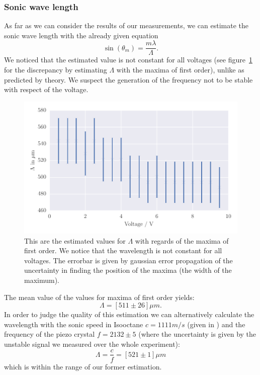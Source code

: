 \subsubsection{Sonic wave length}
As far as we can consider the results of our measurements,
we can estimate the sonic wave length with the already
given equation 
\begin{equation}
\sin(\theta_m) = \frac{m \lambda}{\Lambda}.
\end{equation}
We noticed that the estimated value is not constant for all voltages (see figure~\ref{fig:soundspeed} 
for the discrepancy by estimating $\Lambda$ with the maxima of first order), unlike as predicted by theory.
We suspect the generation of the frequency not to be stable with respect of the voltage.
\begin{figure}[H]
    \centering
    \includegraphics[width=1\textwidth]{analysis/figures/soundspeed}
    \caption{This are the estimated values for $\Lambda$ with regards of the maxima of first order.
    We notice that the wavelength is not constant for all voltages. The errorbar is given by
    gaussian error propagation of the uncertainty in finding the position of the maxima (the
    width of the maximum).}
    \label{fig:soundspeed}
\end{figure}
The mean value of the values for maxima of first order yields:
\begin{equation}
\Lambda = \left [511 \pm 26 \right ] \mu m.
\end{equation}
In order to judge the quality of this estimation we can alternatively calculate the
wavelength with the sonic speed in Isooctane $c = 1111 m/s$ (given in \cite{staatsexamen})
and the 
frequency of the piezo crystal $f =2132 \pm 5$ (where the uncertainty is given
by the unstable signal we measured over the whole experiment):
\begin{equation}
\Lambda = \frac{c}{f} = \left [521 \pm 1 \right ] \mu m
\end{equation}
which is within the range of our former estimation. 


